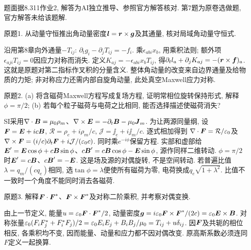 题面据8.311作业2, 解答为AI独立推导、参照官方解答核对. 第7题为原卷选做题, 官方解答未给该题解.
\begin{exercise}
原题1. 从动量守恒推出角动量密度$\boldsymbol{l}=\boldsymbol{r}\times\boldsymbol{g}$及其通量, 核对局域角动量守恒式.
\end{exercise}
\begin{solution}
沿用第8章向外通量$-T_{ij}$: $\partial_tg_i-\partial_jT_{ij}=-f_i$. 乘$\epsilon_{abi}x_b$, 用乘积法则; 额外项$\epsilon_{aji}T_{ij}=0$因应力对称而消失. 定义$K_{aj}=-\epsilon_{abi}x_bT_{ij}$, 得$\partial_tl_a+\partial_jK_{aj}=-(\boldsymbol{r}\times\boldsymbol{f})_a$. 这就是原题对第二指标作叉积的分量含义. 整体角动量的改变来自边界通量及给物质的力矩; 非对称应力还需内部自旋角动量, 此处真空Maxwell应力对称.
\end{solution}
\begin{exercise}
原题2. (a) 将含磁荷Maxwell方程写成复场方程, 证明常相位旋转保持形式, 解释$\phi=\pi/2$; (b) 若每个粒子磁荷与电荷之比相同, 能否选择描述使磁荷消失?
\end{exercise}
\begin{solution}
SI采用$\nabla\cdot\boldsymbol{B}=\mu_0\rho_m$、$\nabla\times\boldsymbol{E}=-\partial_t\boldsymbol{B}-\mu_0\boldsymbol{J}_m$. 为让两源同量纲, 设$\boldsymbol{F}=\boldsymbol{E}+ic\boldsymbol{B}$, $\mathcal R=\rho_e+i\rho_m/c$, $\mathcal J=\jj_e+i\jj_m/c$. 逐式相加得到
$\nabla\cdot\boldsymbol{F}=\mathcal R/\varepsilon_0$及$\nabla\times\boldsymbol{F}=(i/c)\partial_t\boldsymbol{F}+i\mathcal J/(\varepsilon_0 c)$. 同时乘$e^{-i\phi}$保留方程. 实部和虚部给$\boldsymbol{E}'=\boldsymbol{E}\cos\phi+c\boldsymbol{B}\sin\phi$、$c\boldsymbol{B}'=c\boldsymbol{B}\cos\phi-\boldsymbol{E}\sin\phi$, 源作同样二维转动. $\phi=\pi/2$时$\boldsymbol{E}'=c\boldsymbol{B}$、$c\boldsymbol{B}'=-\boldsymbol{E}$. 这是场及源的对偶旋转, 不是空间转动. 若普遍比值$\lambda=q_m/(cq_e)$相同, 选$\tan\phi=\lambda$便使所有磁荷为零, 电荷换成$q_e\sqrt{1+\lambda^2}$. 比值不一致时一个角度不能同时消去各磁荷.
\end{solution}
\begin{exercise}
原题3. 解释$\boldsymbol{F}\cdot\boldsymbol{F}^*$、$\boldsymbol{F}\times\boldsymbol{F}^*$及对称二阶乘积, 并考察对偶变换.
\end{exercise}
\begin{solution}
由上一节定义, 能量$u=\varepsilon_0\boldsymbol{F}\cdot\boldsymbol{F}^*/2$, 动量密度$\boldsymbol{g}=i\varepsilon_0\boldsymbol{F}\times\boldsymbol{F}^*/(2c)=\varepsilon_0\boldsymbol{E}\times\boldsymbol{B}$. 对称张量$\varepsilon_0(F_iF_j^*+F_i^*F_j)/2=\varepsilon_0 E_iE_j+B_iB_j/\mu_0=T_{ij}+u\delta_{ij}$. 因$\boldsymbol{F}$及共轭的相位相反, 各乘积均不变, 因而能量、动量和应力都不因对偶改变. 原高斯系数必须连同$F$定义一起换算.
\end{solution}
